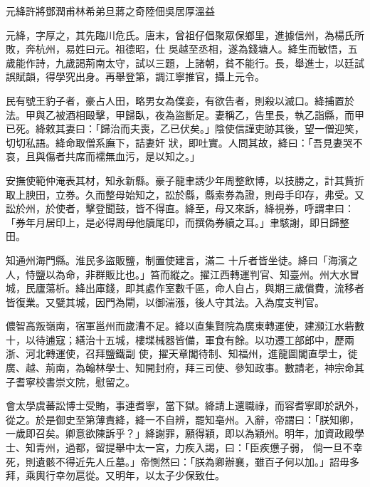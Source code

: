 
\begin{pinyinscope}

 元絳許將鄧潤甫林希弟旦蔣之奇陸佃吳居厚溫益



 元絳，字厚之，其先臨川危氏。唐末，曾祖仔倡聚眾保鄉里，進據信州，為楊氏所敗，奔杭州，易姓曰元。祖德昭，仕
 吳越至丞相，遂為錢塘人。絳生而敏悟，五歲能作詩，九歲謁荊南太守，試以三題，上諸朝，貧不能行。長，舉進士，以廷試誤賦韻，得學究出身。再舉登第，調江寧推官，攝上元令。



 民有號王豹子者，豪占人田，略男女為僕妾，有欲告者，則殺以滅口。絳捕置於法。甲與乙被酒相毆擊，甲歸臥，夜為盜斷足。妻稱乙，告里長，執乙詣縣，而甲已死。絳敕其妻曰：「歸治而夫喪，乙已伏矣。」陰使信謹吏跡其後，望一僧迎笑，切切私語。絳命取僧系廡下，詰妻奸
 狀，即吐實。人問其故，絳曰：「吾見妻哭不哀，且與傷者共席而襦無血污，是以知之。」



 安撫使範仲淹表其材，知永新縣。豪子龍聿誘少年周整飲博，以技勝之，計其貲折取上腴田，立券。久而整母始知之，訟於縣，縣索券為證，則母手印存，弗受。又訟於州，於使者，擊登聞鼓，皆不得直。絳至，母又來訴，絳視券，呼謂聿曰：「券年月居印上，是必得周母他牘尾印，而撰偽券續之耳。」聿駭謝，即日歸整田。



 知通州海門縣。淮民多盜販鹽，制置使建言，滿二
 十斤者皆坐徒。絳曰「海濱之人，恃鹽以為命，非群販比也。」笞而縱之。擢江西轉運判官、知臺州。州大水冒城，民廬蕩析。絳出庫錢，即其處作室數千區，命人自占，與期三歲償費，流移者皆復業。又甓其城，因門為閘，以御湍漲，後人守其法。入為度支判官。



 儂智高叛嶺南，宿軍邕州而歲漕不足。絳以直集賢院為廣東轉運使，建瀕江水砦數十，以待逋寇；繕治十五城，樓堞械器皆備，軍食有餘。以功遷工部郎中，歷兩浙、河北轉運使，召拜鹽鐵副
 使，擢天章閣待制、知福州，進龍圖閣直學士，徙廣、越、荊南，為翰林學士、知開封府，拜三司使、參知政事。數請老，神宗命其子耆寧校書崇文院，慰留之。



 會太學虞蕃訟博士受賄，事連耆寧，當下獄。絳請上還職祿，而容耆寧即於訊外，從之。於是御史至第薄責絳，絳一不自辨，罷知亳州。入辭，帝謂曰：「朕知卿，一歲即召矣。卿意欲陳訴乎？」絳謝罪，願得穎，即以為穎州。明年，加資政殿學士、知青州，過都，留提舉中太一宮，力疾入謁，曰：「臣疾憊子弱，
 倘一旦不幸死，則遺骸不得近先人丘墓。」帝惻然曰：「朕為卿辦襄，雖百子何以加。」詔毋多拜，乘輿行幸勿扈從。又明年，以太子少保致仕。




\end{pinyinscope}
